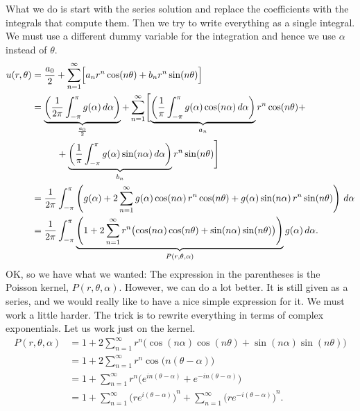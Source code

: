 What we do is start with the series solution and replace the coefficients
with the integrals that compute them.  Then we try to write everything as
a single integral.  We must use a different dummy variable for the
integration and hence we use $\alpha$ instead of $\theta$.
\begin{equation*}
\begin{split}
u(r,\theta)
& =
\frac{a_0}{2} +
\sum_{n=1}^\infty
\Bigl[
a_n r^n \cos(n \theta) + b_n r^n \sin(n \theta)
\Bigr]
\\
& =
\underbrace{
 \left(
  \frac{1}{2\pi} \int_{-\pi}^\pi g(\alpha) \, d\alpha
 \right)
}_{\frac{a_0}{2}}
+
\sum_{n=1}^\infty
\Biggl[
\underbrace{
 \left(
  \frac{1}{\pi} \int_{-\pi}^\pi g(\alpha) \cos (n\alpha) \, d\alpha
 \right)
}_{a_n}
r^n \cos(n \theta) +
\\
& ~~~~~~~~ +
\underbrace{
 \left(
  \frac{1}{\pi} \int_{-\pi}^\pi g(\alpha) \sin (n\alpha) \, d\alpha
 \right)
}_{b_n}
r^n \sin(n \theta)
\Biggr]
\\
& =
\frac{1}{2\pi}
\int_{-\pi}^\pi
\left(  g(\alpha)
+
2
\sum_{n=1}^\infty
g(\alpha) \cos (n\alpha) 
\, r^n \cos(n \theta) +
g(\alpha) \sin (n\alpha)
\, r^n \sin(n \theta)
\right) \,d\alpha
\\
& =
\frac{1}{2\pi}
\int_{-\pi}^\pi
\underbrace{
 \left( 1
 +
 2
 \sum_{n=1}^\infty
 r^n 
 \bigl(
 \cos (n\alpha) 
 \cos(n \theta) +
 \sin (n\alpha)
 \sin(n \theta) \bigr)
 \right)
}_{P(r,\theta,\alpha)}
g(\alpha) \,d\alpha .
\end{split}
\end{equation*}
OK\@, so we have what we wanted: The expression in the parentheses is the
Poisson kernel, $P(r,\theta,\alpha)$.  However, we can do a lot better.  It is still given as a
series, and we would really like to have a nice simple expression for it. 
We must work a little harder.  The trick is to rewrite everything in terms of
complex exponentials.  Let us work
just on the kernel.
\begin{equation*}
\begin{split}
P(r,\theta,\alpha)
& =
1
+
2
\sum_{n=1}^\infty
r^n 
\bigl(
\cos (n\alpha) 
\cos(n \theta) +
\sin (n\alpha)
\sin(n \theta) \bigr)
\\
& =
1
+
2
\sum_{n=1}^\infty
r^n 
\cos \bigl(n(\theta-\alpha)\bigr)
\\
& =
1
+
\sum_{n=1}^\infty
r^n 
\bigl(
e^{in(\theta-\alpha)} +
e^{-in(\theta-\alpha)} \bigr)
\\
& =
1
+
\sum_{n=1}^\infty
{\bigl(
re^{i(\theta-\alpha)}\bigr)}^{n}
+
\sum_{n=1}^\infty
{\bigl(
re^{-i(\theta-\alpha)}\bigr)}^{n} .
\end{split}
\end{equation*}
